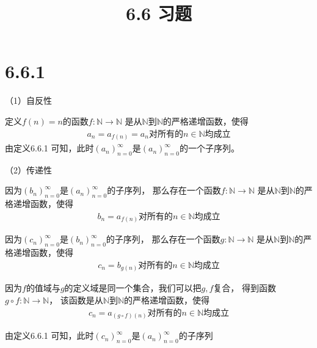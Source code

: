 \documentclass{article}
\theoremstyle{mystyle}
\begin{document}
\title{6.6 习题}
\maketitle

\section*{6.6.1}

（1）自反性

定义$f(n)=n$的函数$f : \mathbb{N} \rightarrow \mathbb{N}$
是从$\mathbb{N}$到$\mathbb{N}$的严格递增函数，使得
\begin{align*}
  a_n = a_{f(n)} = a_n \text{对所有的$n \in \mathbb{N}$均成立}
\end{align*}
由定义6.6.1 可知，此时$(a_n)_{n=0}^\infty$是$(a_n)_{n=0}^\infty$的一个子序列。

（2）传递性

因为$(b_n)_{n=0}^\infty$是$(a_n)_{n=0}^\infty$的子序列，
那么存在一个函数$f : \mathbb{N} \rightarrow \mathbb{N}$
是从$\mathbb{N}$到$\mathbb{N}$的严格递增函数，使得
\begin{align*}
  b_n = a_{f(n)} \text{对所有的$n \in \mathbb{N}$均成立}
\end{align*}

因为$(c_n)_{n=0}^\infty$是$(b_n)_{n=0}^\infty$的子序列，
那么存在一个函数$g : \mathbb{N} \rightarrow \mathbb{N}$
是从$\mathbb{N}$到$\mathbb{N}$的严格递增函数，使得
\begin{align*}
  c_n = b_{g(n)} \text{对所有的$n \in \mathbb{N}$均成立}
\end{align*}

因为$f$的值域与$g$的定义域是同一个集合，我们可以把$g,f$复合，
得到函数$g \circ f : \mathbb{N} \rightarrow \mathbb{N}$，
该函数是从$\mathbb{N}$到$\mathbb{N}$的严格递增函数，使得
\begin{align*}
  c_n = a_{(g \circ f)(n)} \text{对所有的$n \in \mathbb{N}$均成立}
\end{align*}

由定义6.6.1 可知，此时$(c_n)_{n=0}^\infty$是$(a_n)_{n=0}^\infty$的子序列
\end{document}

